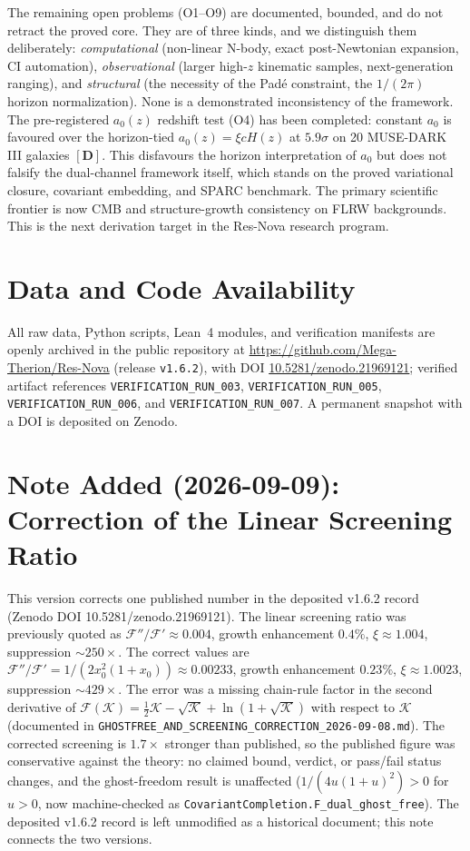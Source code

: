 \documentclass[aps,prd,preprint,superscriptaddress,nofootinbib,amsmath,amssymb,floatfix]{revtex4-2}
\begin{document}
The remaining open problems (O1--O9) are documented, bounded, and do not retract the proved core. They are of three kinds, and we distinguish them deliberately: \emph{computational} (non-linear N-body, exact post-Newtonian expansion, CI automation), \emph{observational} (larger high-$z$ kinematic samples, next-generation ranging), and \emph{structural} (the necessity of the Pad\'e constraint, the $1/(2\pi)$ horizon normalization). None is a demonstrated inconsistency of the framework. The pre-registered $a_0(z)$ redshift test (O4) has been completed: constant $a_0$ is favoured over the horizon-tied $a_0(z) = \xi c H(z)$ at $5.9\sigma$ on 20 MUSE-DARK III galaxies $\mathbf{[D]}$. This disfavours the horizon interpretation of $a_0$ but does not falsify the dual-channel framework itself, which stands on the proved variational closure, covariant embedding, and SPARC benchmark. The primary scientific frontier is now CMB and structure-growth consistency on FLRW backgrounds. This is the next derivation target in the Res-Nova research program.

\section*{Data and Code Availability}
All raw data, Python scripts, Lean~4 modules, and verification manifests are openly archived in the public repository at \url{https://github.com/Mega-Therion/Res-Nova} (release \texttt{v1.6.2}), with DOI \href{https://doi.org/10.5281/zenodo.21969121}{10.5281/zenodo.21969121}; verified artifact references \texttt{VERIFICATION\_RUN\_003}, \texttt{VERIFICATION\_RUN\_005}, \texttt{VERIFICATION\_RUN\_006}, and \texttt{VERIFICATION\_RUN\_007}. A permanent snapshot with a DOI is deposited on Zenodo.

\section*{Note Added (2026-09-09): Correction of the Linear Screening Ratio}
This version corrects one published number in the deposited v1.6.2 record (Zenodo DOI 10.5281/zenodo.21969121). The linear screening ratio was previously quoted as $\mathcal{F}''/\mathcal{F}' \approx 0.004$, growth enhancement $0.4\%$, $\xi \approx 1.004$, suppression $\sim250\times$. The correct values are $\mathcal{F}''/\mathcal{F}' = 1/(2x_0^2(1+x_0)) \approx 0.00233$, growth enhancement $0.23\%$, $\xi \approx 1.0023$, suppression $\sim429\times$. The error was a missing chain-rule factor in the second derivative of $\mathcal{F}(\mathcal{K}) = \tfrac{1}{2}\mathcal{K} - \sqrt{\mathcal{K}} + \ln(1+\sqrt{\mathcal{K}})$ with respect to $\mathcal{K}$ (documented in \texttt{GHOSTFREE\_AND\_SCREENING\_CORRECTION\_2026-09-08.md}). The corrected screening is $1.7\times$ stronger than published, so the published figure was conservative against the theory: no claimed bound, verdict, or pass/fail status changes, and the ghost-freedom result is unaffected ($1/(4u(1+u)^2) > 0$ for $u > 0$, now machine-checked as \texttt{CovariantCompletion.F\_dual\_ghost\_free}). The deposited v1.6.2 record is left unmodified as a historical document; this note connects the two versions.
\end{document}
